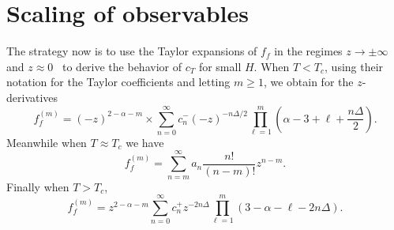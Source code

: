 \section{Scaling of observables}


The strategy now is to use the Taylor expansions of $f_f$ in the regimes
$z\to\pm\infty$ and $z\approx 0$~\cite{Engels:2011km} to derive the
behavior of $c_T$ for small $H$. When $T<T_c$, using their
notation for the Taylor coefficients and letting $m\geq1$,
we obtain for the $z$-derivatives
\begin{equation}
    f_f^{(m)}=(-z)^{2-\alpha-m}
    \times\sum_{n=0}^\infty c_n^-(-z)^{-n\Delta/2}\prod_{\ell=1}^m\left(\alpha-3+\ell+\frac{n\Delta}{2}\right).
\end{equation}
Meanwhile when $T\approx T_c$ we have 
\begin{equation}
    f_f^{(m)}=\sum_{n=m}^\infty a_n\frac{n!}{(n-m)!}z^{n-m}.
\end{equation}
Finally when $T>T_c$,
\begin{equation}
    f_f^{(m)}=z^{2-\alpha-m}\sum_{n=0}^\infty c_n^+z^{-2n\Delta}\prod_{\ell=1}^m\left(3-\alpha-\ell-2n\Delta\right).
\end{equation}





